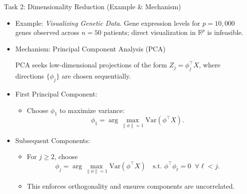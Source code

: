 \documentclass[aspectratio=169]{beamer}
\newcommand{\1}{\mathbf{1}}
\begin{document}
\begin{frame}{Task 2: Dimensionality Reduction (Example \& Mechanism)}
    \small
    \begin{itemize}
        \item Example:
        \textit{Visualizing Genetic Data}.  
        Gene expression levels for $p=10{,}000$ genes observed across $n=50$ patients;
        direct visualization in $\mathbb{R}^p$ is infeasible.
        
        \item Mechanism: Principal Component Analysis (PCA)
        
        PCA seeks low-dimensional projections of the form
        $Z_j = \phi_j^\top X$, where directions $\{\phi_j\}$ are chosen sequentially.
        
        \item First Principal Component:
        \begin{itemize}
            \item Choose $\phi_1$ to maximize variance:
            \[
                \phi_1
                =
                \arg\max_{\|\phi\|=1}
                \text{Var}(\phi^\top X).
            \]
        \end{itemize}
        
        \item Subsequent Components:
        \begin{itemize}
            \item For $j \ge 2$, choose
            \[
                \phi_j
                =
                \arg\max_{\|\phi\|=1}
                \text{Var}(\phi^\top X)
                \quad
                \text{s.t. } \phi^\top \phi_\ell = 0 \;\; \forall \ell < j.
            \]
            \item This enforces orthogonality and ensures components are uncorrelated.
        \end{itemize}
        
    \end{itemize}
\end{frame}
\end{document}

